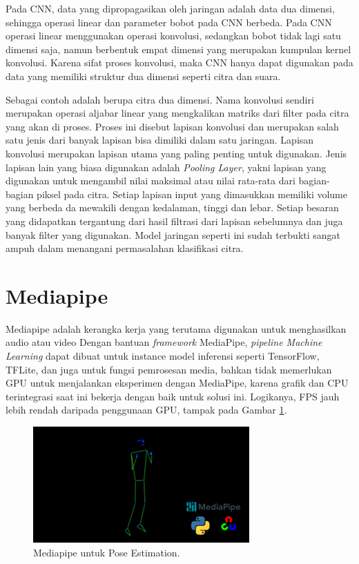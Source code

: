 Pada CNN, data yang dipropagasikan oleh jaringan adalah data dua dimensi, sehingga operasi linear dan parameter bobot pada CNN berbeda. Pada CNN operasi linear menggunakan operasi konvolusi, sedangkan bobot tidak lagi satu dimensi saja, namun berbentuk empat dimensi yang merupakan kumpulan kernel konvolusi. Karena sifat proses konvolusi, maka CNN hanya dapat digunakan pada data yang memiliki struktur dua dimensi seperti citra dan suara.

Sebagai contoh adalah berupa citra dua dimensi. Nama konvolusi sendiri merupakan operasi aljabar linear yang mengkalikan matriks dari filter pada citra yang akan di proses. Proses ini disebut lapisan konvolusi dan merupakan salah satu jenis dari banyak lapisan bisa dimiliki dalam satu jaringan. Lapisan konvolusi merupakan lapisan utama yang paling penting untuk digunakan. Jenis lapisan lain yang biasa digunakan adalah \emph{Pooling Layer}, yakni lapisan yang digunakan untuk mengambil nilai maksimal atau nilai rata-rata dari bagian-bagian piksel pada citra. Setiap lapisan input yang dimasukkan memiliki volume yang berbeda da mewakili dengan kedalaman, tinggi dan lebar. Setiap besaran yang didapatkan tergantung dari hasil filtrasi dari lapisan sebelumnya dan juga banyak filter yang digunakan. Model jaringan seperti ini sudah terbukti sangat ampuh dalam menangani permasalahan klasifikasi citra. 


\section{Mediapipe}
\label{sec:mediapipe}

Mediapipe adalah kerangka kerja yang terutama digunakan untuk menghasilkan audio atau video Dengan bantuan \emph{framework} MediaPipe, \emph{pipeline Machine Learning} dapat dibuat untuk instance model inferensi seperti TensorFlow, TFLite, dan juga untuk fungsi pemrosesan media, bahkan tidak memerlukan GPU untuk menjalankan eksperimen dengan MediaPipe, karena grafik dan CPU terintegrasi saat ini bekerja dengan baik untuk solusi ini. Logikanya, FPS jauh lebih rendah daripada penggunaan GPU, tampak pada Gambar \ref{fig:mediapipe}.

\begin{figure}[H]
  \centering
  \includegraphics[scale=1]{gambar/mediapipe.png}
  \caption{Mediapipe untuk Pose Estimation.}
  \label{fig:mediapipe}
\end{figure}
